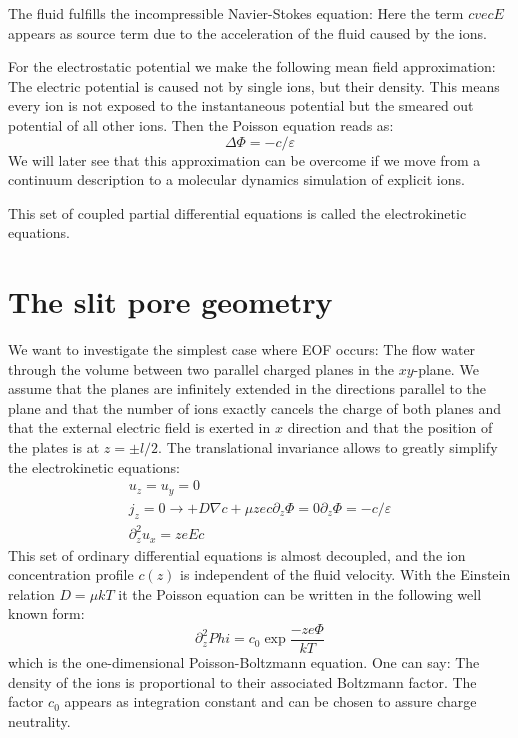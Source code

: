 The fluid fulfills the incompressible Navier-Stokes equation:
Here the term $c vec{E}$ appears as source term due
to the acceleration of the fluid caused by the ions. 

For the electrostatic potential we make the following
mean field approximation: The electric potential is 
caused not by single ions, but their density. This means
every ion is not exposed to the instantaneous potential
but the smeared out potential of all other ions. Then the Poisson
equation reads as:
\begin{equation}
  \Delta \Phi = -c/\varepsilon
  \label{asdf}
\end{equation}
We will later
see that this approximation can be overcome if we move
from a continuum description to a molecular dynamics simulation
of explicit ions.

This set of coupled partial differential equations is called
the electrokinetic equations. 

\section{The slit pore geometry}
We want to investigate the simplest case where EOF occurs:
The flow water through the volume between two parallel
charged planes in the $xy$-plane. We assume that the planes are infinitely
extended in the directions parallel to the plane and that
the number of ions exactly cancels the charge of both planes
and that the external electric field is exerted in $x$ direction
and that the position of the plates is at $z=\pm l/2$.
The translational invariance allows to greatly simplify the
electrokinetic equations:
\begin{eqnarray}
  u_z = u_y = 0 \\
  j_z = 0 \rightarrow +D \nabla c + \mu ze c \partial_z \Phi = 0
  \partial_z \Phi = -c/\varepsilon \\
  \partial_z^2 u_x = zeEc
  \label{EOF}
\end{eqnarray}
This set of ordinary differential equations is almost decoupled, 
and the ion concentration profile $c\left(z\right)$ is independent
of the fluid velocity. With the Einstein relation $D=\mu kT$ it the
Poisson equation can be written in the following well known form:
\begin{equation}
  \partial_z^2 Phi = c_0 \exp{\frac{-ze\Phi}{kT}}
\end{equation}
which is the one-dimensional Poisson-Boltzmann equation. One can say:
The density of the ions is proportional to their associated
Boltzmann factor. The factor $c_0$ appears as integration constant
and can be chosen to assure charge neutrality.

